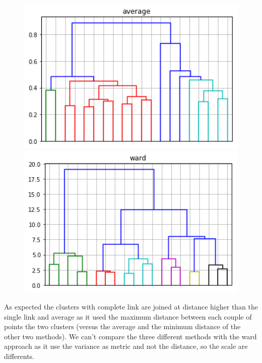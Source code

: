 \begin{figure}[h]
  \begin{minipage}[h]{.50\textwidth}    
    \includegraphics[width=1\textwidth]{img/ch3/hierarchical_average}
  \end{minipage}  
  \begin{minipage}[h]{.50\textwidth}    
    \includegraphics[width=1\textwidth]{img/ch3/hierarchical_ward}
  \end{minipage}  
\end{figure}


As expected the clusters with complete link are joined at distance higher than the single link and average as it used the maximum distance between each couple of points the two clusters (versus the average and the minimum distance of the other two methods). We can't compare the three different methods with the ward approach as it use the variance as metric and not the distance, so the scale are differents.

